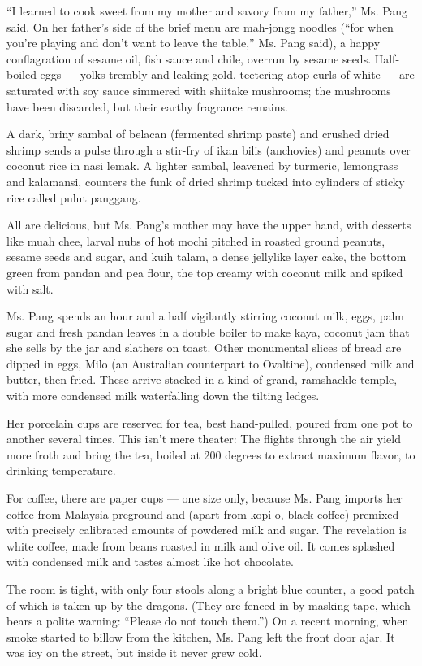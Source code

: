 ``I learned to cook sweet from my mother and savory from my father,''
Ms. Pang said. On her father's side of the brief menu are mah-jongg
noodles (``for when you're playing and don't want to leave the table,''
Ms. Pang said), a happy conflagration of sesame oil, fish sauce and
chile, overrun by sesame seeds. Half-boiled eggs --- yolks trembly and
leaking gold, teetering atop curls of white --- are saturated with soy
sauce simmered with shiitake mushrooms; the mushrooms have been
discarded, but their earthy fragrance remains.

A dark, briny sambal of belacan (fermented shrimp paste) and crushed
dried shrimp sends a pulse through a stir-fry of ikan bilis (anchovies)
and peanuts over coconut rice in nasi lemak. A lighter sambal, leavened
by turmeric, lemongrass and kalamansi, counters the funk of dried shrimp
tucked into cylinders of sticky rice called pulut panggang.

All are delicious, but Ms. Pang's mother may have the upper hand, with
desserts like muah chee, larval nubs of hot mochi pitched in roasted
ground peanuts, sesame seeds and sugar, and kuih talam, a dense
jellylike layer cake, the bottom green from pandan and pea flour, the
top creamy with coconut milk and spiked with salt.

Ms. Pang spends an hour and a half vigilantly stirring coconut milk,
eggs, palm sugar and fresh pandan leaves in a double boiler to make
kaya, coconut jam that she sells by the jar and slathers on toast. Other
monumental slices of bread are dipped in eggs, Milo (an Australian
counterpart to Ovaltine), condensed milk and butter, then fried. These
arrive stacked in a kind of grand, ramshackle temple, with more
condensed milk waterfalling down the tilting ledges.

Her porcelain cups are reserved for tea, best hand-pulled, poured from
one pot to another several times. This isn't mere theater: The flights
through the air yield more froth and bring the tea, boiled at 200
degrees to extract maximum flavor, to drinking temperature.

For coffee, there are paper cups --- one size only, because Ms. Pang
imports her coffee from Malaysia preground and (apart from kopi-o, black
coffee) premixed with precisely calibrated amounts of powdered milk and
sugar. The revelation is white coffee, made from beans roasted in milk
and olive oil. It comes splashed with condensed milk and tastes almost
like hot chocolate.

The room is tight, with only four stools along a bright blue counter, a
good patch of which is taken up by the dragons. (They are fenced in by
masking tape, which bears a polite warning: ``Please do not touch
them.'') On a recent morning, when smoke started to billow from the
kitchen, Ms. Pang left the front door ajar. It was icy on the street,
but inside it never grew cold.

